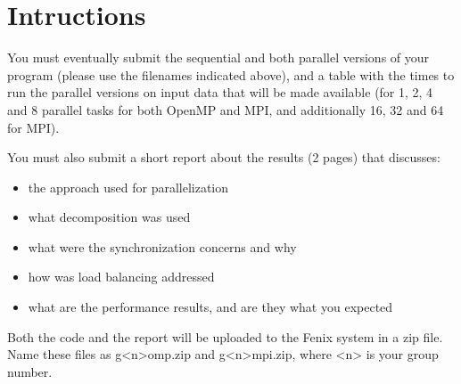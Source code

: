 \documentclass[twocolumn]{article}
\date{}
\title{
    \texttt{[image: images/logo.png]}\\
    \vskip 0.5em
    \Huge Distributed and Parallel Computing\\
    \LARGE OpenMP Report\\
}
\author{
    Pedro Rio\\
    \textit{MSc Data Science and Engineering}\\
    \textit{Instituto Superior Técnico}\\
    \textit{97241}
    \and
    Sebastião Maia Serqueira\\
    \textit{MSc Data Science and Engineering}\\
    \textit{Instituto Superior Técnico}\\
    \textit{97108}\\
    \and
    Eduardo Machado\\
    \textit{MSc Data Science and Engineering}\\
    \textit{Instituto Superior Técnico}\\
    \textit{97133}
}
\begin{document}
    \maketitle

    \section{Intructions}\label{sec:intructions}
    You must eventually submit the sequential and both parallel versions of your program (please use the
    filenames indicated above), and a table with the times to run the parallel versions on input data that
    will be made available (for 1, 2, 4 and 8 parallel tasks for both OpenMP and MPI, and additionally
    16, 32 and 64 for MPI).

    You must also submit a short report about the results (2 pages) that discusses:
    \begin{itemize}
        \item the approach used for parallelization
        \item what decomposition was used
        \item what were the synchronization concerns and why
        \item how was load balancing addressed
        \item what are the performance results, and are they what you expected
    \end{itemize}

    Both the code and the report will be uploaded to the Fenix
    system in a zip file.
    Name these files as g<n>omp.zip and g<n>mpi.zip, where <n> is your
    group number.

    \cleardoublepage~\nocite{*}
    
    
\end{document}
